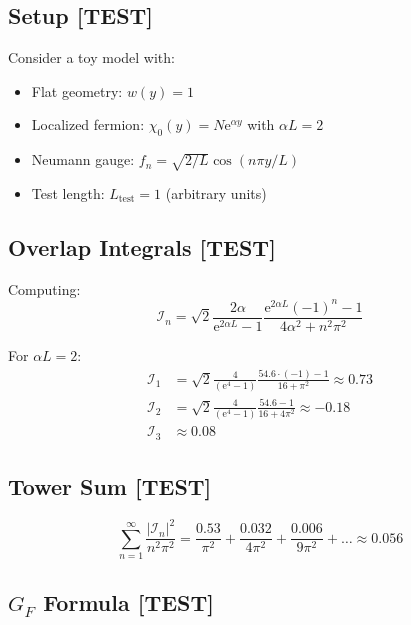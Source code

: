 \documentclass[11pt,a4paper]{article}
\newcommand{\ee}{\mathrm{e}}
\begin{document}
\subsection{Setup [TEST]}

Consider a toy model with:
\begin{itemize}
\item Flat geometry: $w(y) = 1$
\item Localized fermion: $\chi_0(y) = N \ee^{\alpha y}$ with $\alpha L = 2$
\item Neumann gauge: $f_n = \sqrt{2/L}\cos(n\pi y/L)$
\item Test length: $L_{\text{test}} = 1$ (arbitrary units)
\end{itemize}

\subsection{Overlap Integrals [TEST]}

Computing:
\begin{equation}
\mathcal{I}_n = \sqrt{2} \frac{2\alpha}{\ee^{2\alpha L}-1}
\frac{\ee^{2\alpha L}(-1)^n - 1}{4\alpha^2 + n^2\pi^2}
\label{eq:toy-overlap}
\end{equation}

For $\alpha L = 2$:
\begin{equation}
\begin{aligned}
\mathcal{I}_1 &= \sqrt{2} \frac{4}{(\ee^4-1)} \frac{54.6 \cdot (-1) - 1}{16 + \pi^2} \approx 0.73 \\
\mathcal{I}_2 &= \sqrt{2} \frac{4}{(\ee^4-1)} \frac{54.6 - 1}{16 + 4\pi^2} \approx -0.18 \\
\mathcal{I}_3 &\approx 0.08
\end{aligned}
\label{eq:toy-values}
\end{equation}

\subsection{Tower Sum [TEST]}

\begin{equation}
\sum_{n=1}^{\infty} \frac{|\mathcal{I}_n|^2}{n^2\pi^2}
= \frac{0.53}{\pi^2} + \frac{0.032}{4\pi^2} + \frac{0.006}{9\pi^2} + \ldots
\approx 0.056
\label{eq:toy-sum}
\end{equation}

\subsection{$G_F$ Formula [TEST]}
\end{document}
